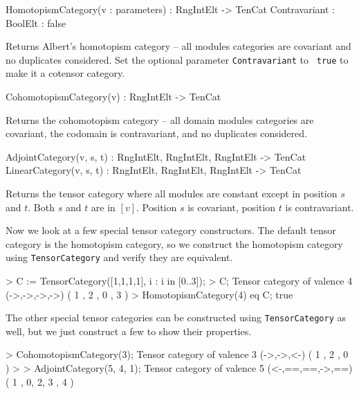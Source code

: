 \begin{intrinsics}
HomotopismCategory(v : parameters) : RngIntElt -> TenCat
    Contravariant : BoolElt : false
\end{intrinsics}

Returns Albert's homotopism category -- all modules categories are covariant and
no duplicates considered. Set the optional parameter {\tt Contravariant} to {\tt
true} to make it a cotensor category.

\begin{intrinsics}
CohomotopismCategory(v) : RngIntElt -> TenCat
\end{intrinsics}

Returns the cohomotopism category -- all domain modules categories are 
covariant, the codomain is contravariant, and no duplicates considered.

\begin{intrinsics}
AdjointCategory(v, s, t) : RngIntElt, RngIntElt, RngIntElt -> TenCat
LinearCategory(v, s, t) : RngIntElt, RngIntElt, RngIntElt -> TenCat
\end{intrinsics}

Returns the tensor category where all modules are constant except in position 
$s$ and $t$.  Both $s$ and $t$ are in $[v]$.
Position $s$ is covariant, position $t$ is contravariant.

\begin{example}[TenCatSpecial]

Now we look at a few special tensor category constructors. The default tensor
category is the homotopism category, so we construct the homotopism category
using \texttt{TensorCategory} and verify they are equivalent.
\begin{code}
> C := TensorCategory([1,1,1,1], {{i} : i in [0..3]});
> C;
Tensor category of valence 4 (->,->,->,->) ({ 1 },{ 2 },{ 0 },{ 3 })
> HomotopismCategory(4) eq C;
true
\end{code}

The other special tensor categories can be constructed using
\texttt{TensorCategory} as well, but we just construct a few to show their
properties.
\begin{code}
> CohomotopismCategory(3);
Tensor category of valence 3 (->,->,<-) ({ 1 },{ 2 },{ 0 })
> 
> AdjointCategory(5, 4, 1);
Tensor category of valence 5 (<-,==,==,->,==) ({ 1 },{ 0, 2, 3 },{ 4 })
\end{code}
\end{example}

